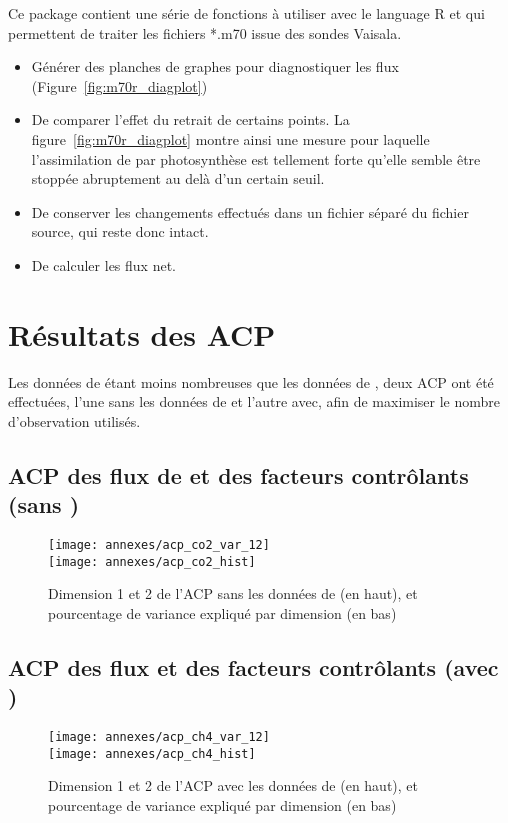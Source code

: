 Ce package contient une série de fonctions à utiliser avec le language R et qui permettent de traiter les fichiers *.m70 issue des sondes Vaisala.

\begin{itemize}
\item Générer des planches de graphes pour diagnostiquer les flux (Figure~\ref{fig:m70r_diagplot})
\item De comparer l'effet du retrait de certains points. La figure~\ref{fig:m70r_diagplot} montre ainsi une mesure pour laquelle l'assimilation de \coo par photosynthèse est tellement forte qu'elle semble être stoppée abruptement au delà d'un certain seuil.
\item De conserver les changements effectués dans un fichier séparé du fichier source, qui reste donc intact.
\item De calculer les flux net.
\end{itemize}

\clearpage
\section{Résultats des ACP}
\label{sec:acp}

Les données de \chh étant moins nombreuses que les données de \coo, deux ACP ont été effectuées, l'une sans les données de \chh et l'autre avec, afin de maximiser le nombre d'observation utilisés.

\subsection{ACP des flux de \coo et des facteurs contrôlants (sans \chh)}

\begin{figure}[!hbt]
\centering
\texttt{[image: annexes/acp\_co2\_var\_12]}\\
\texttt{[image: annexes/acp\_co2\_hist]}
\caption{Dimension 1 et 2 de l'ACP sans les données de \chh (en haut), et pourcentage de variance expliqué par dimension (en bas)}
\label{fig:acp_co2}
\end{figure}


\subsection{ACP des flux et des facteurs contrôlants (avec \chh)}

\begin{figure}[!hbt]
\centering
\texttt{[image: annexes/acp\_ch4\_var\_12]}\\
\texttt{[image: annexes/acp\_ch4\_hist]}
\caption{Dimension 1 et 2 de l'ACP avec les données de \chh (en haut), et pourcentage de variance expliqué par dimension (en bas)}
\label{fig:acp_ch4}
\end{figure}



